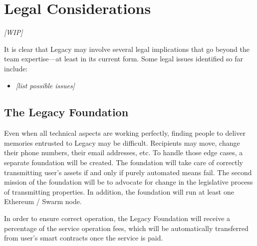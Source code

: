 \chapter{Legal Considerations} %
\label{cha:legal_considerations}

\textit{[WIP]}

It is clear that Legacy may involve several legal implications that go beyond the team expertise---at least in its current form. Some legal issues identified so far include:

\begin{itemize}
	\item \textit{[list possible issues]}
\end{itemize}


\section{The Legacy Foundation} %
\label{sec:the_legacy_foundation}

Even when all technical aspects are working perfectly, finding people to deliver memories entrusted to Legacy may be difficult. Recipients may move, change their phone numbers, their email addresses, etc. To handle those edge cases, a separate foundation will be created. The foundation will take care of correctly transmitting user’s assets if and only if purely automated means fail. 
The second mission of the foundation will be to advocate for change in the legislative process of transmitting properties.
In addition, the foundation will run at least one Ethereum / Swarm node.

In order to ensure correct operation, the Legacy Foundation will receive a percentage of the service operation fees, which will be automatically transferred from user’s smart contracts once the service is paid.


